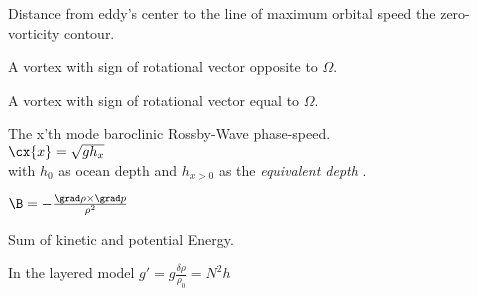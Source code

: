 \begin{fullwidth}
\begin{multicols}{2}
\begin{definition}\label{def:scale}
Distance from eddy's center to the line of maximum orbital speed \ie the zero-vorticity contour.
\end{definition}
\begin{definition}\label{def:AC}
A vortex with sign of rotational vector opposite to \href{def:Omega}{$\Omega$}.
\end{definition}
\begin{definition}[Cyclone (\C)]\label{def:C}
A vortex with sign of rotational vector equal to \href{def:Omega}{$\Omega$}.
\end{definition}
\begin{definition}\label{def:c}
The x'th mode baroclinic Rossby-Wave phase-speed.\\
$\cx{x}  = \sqrt{g h_{x}} $ \\
with $h_{0}$ as ocean depth and $h_{x>0}$ as the \textit{equivalent depth} \citep[chapter 8.1.1]{olbers2012ocean}.
\end{definition}
\begin{definition} \label{def:B }
$\B = -\frac{ \grad \rho 	\times \grad p}{ \rho^{2}} $
\end{definition}
\begin{definition} \label{def:E_k}
\end{definition}
\begin{definition} \label{def:E_m}
Sum of kinetic and potential Energy.
\end{definition}
\begin{definition}\label{def:gr}
In the layered model $g'=g \frac{\delta \rho}{\rho_0} = N^{2}h$

\end{definition}
\end{multicols}
\end{fullwidth}
